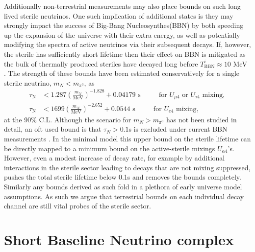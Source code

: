 \documentclass[11pt, a4paper]{article}
\begin{document}
Additionally non-terrestrial measurements may also place bounds on such long lived sterile neutrinos. One such implication of additional states is they may strongly impact the success of Big-Bang Nucleosynthes(BBN) by both speeding up the expansion of the universe with their extra energy, as well as potentially modifying the spectra of active neutrinos via their subsequent decays. If, however, the sterile has sufficiently short lifetime  then their effect on BBN is mitigated as the bulk of thermally produced steriles have decayed long before $T^i_\text{BBN} \approx 10$ MeV \cite{Fields:2006ga}. The strength of these bounds have been estimated conservatively for a single sterile neutrino, $m_N < m_{\pi^0}$, as \cite{Dolgov:2000jw,Dolgov:2000pj}
\begin{align*}
	\tau_\text{N} &< 1.287 \left( \frac{m_N}{\text{MeV}}\right)^{-1.828}+0.04179 \text{  s    $\qquad$  for $U_{\mu 4}$ or $U_{\tau 4}$ mixing},\\
	\tau_\text{N} &< 1699 \left( \frac{m_N}{\text{MeV}}\right)^{-2.652}+0.0544 \text{  s    $\qquad$  for $U_{e 4}$ mixing},
\end{align*}
at the 90\% C.L. Although the scenario for $m_N > m_{\pi^0}$ has not been studied in detail, an oft used bound is that $\tau_N > 0.1$s is excluded under current BBN measurements \cite{Dolgov:2000j}. In the minimal model this upper bound on the sterile lifetime can be directly mapped to a minimum bound on the active-sterile mixings $U_{\alpha 4}$'s. However, even a modest increase of decay rate, for example by additional interactions in the sterile sector leading to decays that are not mixing suppressed, pushes the total sterile lifetime below 0.1s and removes the bounds completely. Similarly any bounds derived as such fold in a plethora of early universe model assumptions. As such we argue that terrestrial bounds on each individual decay channel are still vital probes of the sterile sector. \\

\section{\label{sec:simulation}Short Baseline Neutrino complex}
\end{document}
